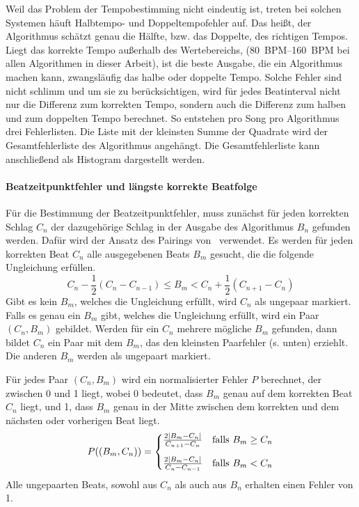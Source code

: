 {{{			%
			Weil das Problem der Tempobestimming nicht eindeutig ist,
				treten bei solchen Systemen häuft Halbtempo- und Doppeltempofehler auf.
			Das hei{\ss}t,
				der Algorithmus schätzt genau die Hälfte, bzw. das Doppelte, des richtigen Tempos.
			Liegt das korrekte Tempo au{\ss}erhalb des Wertebereichs,
				(\SIrange{80}{160}{BPM} bei allen Algorithmen in dieser Arbeit),
				ist die beste Ausgabe,
				die ein Algorithmus machen kann,
				zwangsläufig das halbe oder doppelte Tempo.
			Solche Fehler sind nicht schlimm
				und um sie zu berücksichtigen,
				wird für jedes Beatinterval nicht nur die Differenz zum korrekten Tempo,
				sondern auch die Differenz zum halben und zum doppelten Tempo berechnet.
			So entstehen pro Song pro Algorithmus drei Fehlerlisten.
			Die Liste mit der kleinsten Summe der Quadrate wird der Gesamtfehlerliste des Algorithmus angehängt.
			Die Gesamtfehlerliste kann anschlie{\ss}end als Histogram dargestellt werden.
		}

		\paragraph{Beatzeitpunktfehler und längste korrekte Beatfolge}
		{
			Für die Bestimmung der Beatzeitpunktfehler,
				muss zunächst für jeden korrekten Schlag $C_n$ der dazugehörige Schlag in der Ausgabe des Algorithmus $B_n$ gefunden werden.
			Dafür wird der Ansatz des Pairings von~\cite{1997_GoMu1} verwendet.
			Es werden für jeden korrekten Beat $C_n$ alle ausgegebenen Beats $B_m$ gesucht,
				die die folgende Ungleichung erfüllen.
			\begin{equation}
				C_n - \frac{1}{2}(C_n - C_{n - 1}) \le B_m < C_n + \frac{1}{2}(C_{n + 1} - C_n)
			\end{equation}
			Gibt es kein $B_m$,
				welches die Ungleichung erfüllt,
				wird $C_n$ als ungepaar markiert.
			Falls es genau ein $B_m$ gibt,
				welches die Ungleichung erfüllt,
				wird ein Paar $(C_n, B_m)$ gebildet.
			Werden für ein $C_n$ mehrere mögliche $B_m$ gefunden,
				dann bildet $C_n$ ein Paar mit dem $B_m$,
				das den kleinsten Paarfehler (s. unten) erziehlt.
			Die anderen $B_m$ werden als ungepaart markiert.

			Für jedes Paar $(C_n, B_m)$ wird ein normalisierter Fehler $P$ berechnet,
				der zwischen \num{0} und \num{1} liegt,
				wobei \num{0} bedeutet,
				dass $B_m$ genau auf dem korrekten Beat $C_n$ liegt,
				und \num{1},
				dass $B_m$ genau in der Mitte zwischen dem korrekten und dem nächsten oder vorherigen Beat liegt.
			\begin{equation}
				P((B_m, C_n)) =
					\begin{cases}
						\frac{2|B_m - C_n|}{C_{n + 1} - C_n} & \text{falls } B_m \ge C_n \vspace{3mm} \\
						\frac{2|B_m - C_n|}{C_n - C_{n - 1}} & \text{falls } B_m  <  C_n
					\end{cases}
			\end{equation}
			Alle ungepaarten Beats,
				sowohl aus $C_n$ als auch aus $B_n$ erhalten einen Fehler von \num{1}.

}}}
